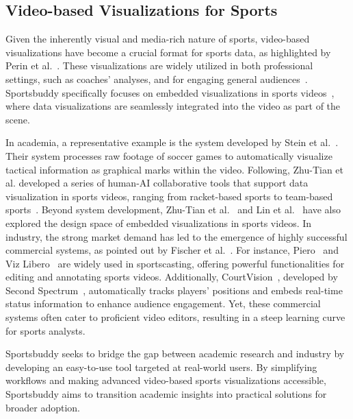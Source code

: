 





\subsection{Video-based Visualizations for Sports}
Given the inherently visual and media-rich nature of sports, 
video-based visualizations have become a crucial format for sports data, 
as highlighted by Perin et al.~\cite{}. 
These visualizations are widely utilized in both professional settings, 
such as coaches' analyses\cite{}, and for engaging general audiences~\cite{}.
Sportsbuddy specifically focuses on embedded visualizations in sports videos~\cite{}, where data visualizations are seamlessly integrated into the video as part of the scene.

In academia, a representative example is the system developed by Stein et al.~\cite{}. 
Their system processes raw footage of soccer games to automatically visualize tactical information as graphical marks within the video. 
Following,
Zhu-Tian et al. developed a series of human-AI collaborative tools that support data visualization in sports videos, ranging from racket-based sports\cite{} to team-based sports~\cite{}. 
Beyond system development, Zhu-Tian et al.~\cite{} and Lin et al.~\cite{} have also explored the design space of embedded visualizations in sports videos.
In industry, the strong market demand has led to the emergence of highly successful commercial systems, as pointed out by Fischer et al.~\cite{}. 
For instance, Piero~\cite{} and Viz Libero~\cite{} are widely used in sportscasting, offering powerful functionalities for editing and annotating sports videos. 
Additionally, CourtVision~\cite{}, developed by Second Spectrum~\cite{}, automatically tracks players' positions and embeds real-time status information to enhance audience engagement.
Yet, these commercial systems often cater to proficient video editors, resulting in a steep learning curve for sports analysts. 

Sportsbuddy seeks to bridge the gap between academic research and industry by developing an easy-to-use tool targeted at real-world users. 
By simplifying workflows and making advanced video-based sports visualizations accessible, 
Sportsbuddy aims to transition academic insights into practical solutions for broader adoption.

